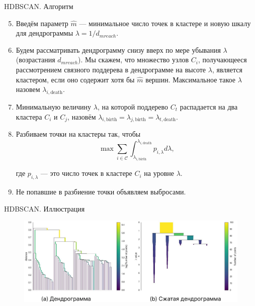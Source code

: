\documentclass[unicode, notheorems, handout]{beamer}
\begin{document}
\begin{frame}{HDBSCAN. Алгоритм}
\footnotesize
\begin{enumerate}
   \setcounter{enumi}{4}
    \item Введём параметр $\hat m$ --- минимальное число точек в кластере и новую шкалу для дендрограммы $\lambda = 1/d_{mreach}$.
    
    \item Будем рассматривать дендрограмму снизу вверх по мере убывания $\lambda$ (возрастания $d_{mreach}$). Мы скажем, что множество узлов $C_i$, получающееся рассмотрением связного поддерева в дендрограмме на высоте $\lambda$, является кластером, если оно содержит хотя бы $\hat m$ вершин. Максимальное такое $\lambda$ назовем $\lambda_{i, \text{death}}$.
    
    \item Минимальную величину $\lambda$, на которой поддерево $C_t$ распадается на два кластера $C_i$ и $C_j$, назовём $\lambda_{i, \text{birth}} = \lambda_{j, \text{birth}} = \lambda_{t, \text{death}}$.
    
    \item Разбиваем точки на кластеры так, чтобы 
    $$\max \sum_{i \in \mathcal{C}} \int_{\lambda_{i, \text{birth}}}^{\lambda_{i, \text{death}}} p_{i, \lambda} d \lambda,$$ 
    
    где $p_{i, \lambda}$ --- это число точек в кластере $C_i$ на уровне $\lambda$.
    
    \item Не попавшие в разбиение точки объявляем выбросами.
\end{enumerate}
\end{frame}

\begin{frame}{HDBSCAN. Иллюстрация}
     \begin{figure}[h]
        \centering
        \includegraphics[width=1.01\textwidth]{hdbscan.pdf} 
    \end{figure}
\end{frame}
\end{document}
